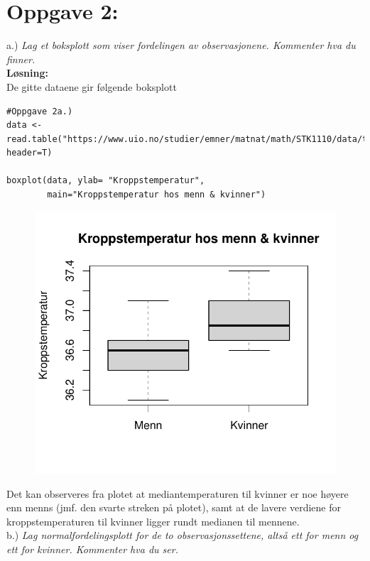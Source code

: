 \documentclass[12pt,
               a4paper,
               article,
               oneside,
               oldfontcommands,
               norsk]{memoir}
\begin{document}
\section*{Oppgave 2:}
a.) \emph{Lag et boksplott som viser fordelingen av observasjonene. Kommenter hva du finner.} \vspace{4mm}\\
\textbf{Løsning:}\vspace{4mm}\\ 
De gitte dataene gir følgende boksplott 
\begin{lstlisting}
#Oppgave 2a.)
data <- read.table("https://www.uio.no/studier/emner/matnat/math/STK1110/data/temp.txt", 
header=T)

boxplot(data, ylab= "Kroppstemperatur", 
        main="Kroppstemperatur hos menn & kvinner") 
\end{lstlisting}
\begin{figure}[H]
	\centering
  \includegraphics[scale=1.15]{Boksplott_temp.pdf}
\end{figure}
Det kan observeres fra plotet at mediantemperaturen til kvinner er noe høyere enn menns (jmf. den svarte streken på plotet), samt at de lavere verdiene for kroppstemperaturen til kvinner ligger rundt medianen til mennene. \vspace{4mm}\\ 
b.) \emph{Lag normalfordelingsplott for de to observasjonssettene, altså ett for menn og ett for kvinner. Kommenter hva du ser.}\vspace{4mm}\\ 
\end{document}
